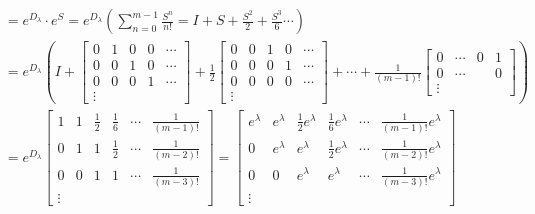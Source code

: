 \begin{align*}
     & =  e^{D_{\lambda}} \cdot e^{S} = e^{D_{\lambda}} \left( \sum_{n=0}^{m - 1} \frac{S^n}{n!} = I + S + \frac{S^2}{2} + \frac{S^3}{6} \cdots \right) \\
     & =  e^{D_{\lambda}} \left(I + \begin{bmatrix} 0 & 1 & 0  &  0 & \cdots \\ 0 & 0 & 1 & 0 & \cdots \\ 0 & 0 & 0 & 1 & \cdots \\ \vdots & & & \end{bmatrix} +
    \frac{1}{2} \begin{bmatrix} 0 & 0 & 1  &  0 & \cdots \\ 0 & 0 & 0 & 1 & \cdots \\ 0 & 0 & 0 & 0 & \cdots \\ \vdots & & & \end{bmatrix} + \cdots +
    \frac{1}{(m-1)!} \begin{bmatrix} 0 &  \cdots & 0 & 1  \\ 0 & \cdots & & 0 \\  \vdots & & & \end{bmatrix}  \right)                                                                                               \\
     & = e^{D_{\lambda}} \begin{bmatrix}
        1      & 1 & \frac{1}{2} & \frac{1}{6} & \cdots & \frac{1}{(m -1)!} \\
        0      & 1 & 1           & \frac{1}{2} & \cdots & \frac{1}{(m -2)!} \\
        0      & 0 & 1           & 1           & \cdots & \frac{1}{(m -3)!} \\
        \vdots &   &             &
    \end{bmatrix} = \begin{bmatrix}
        e^{\lambda} & e^{\lambda} & \frac{1}{2} e^{\lambda} & \frac{1}{6}  e^{\lambda} & \cdots & \frac{1}{(m-1)!}    e^{\lambda} \\
        0           & e^{\lambda} & e^{\lambda}             & \frac{1}{2}  e^{\lambda} & \cdots & \frac{1}{(m-2)!}   e^{\lambda}  \\
        0           & 0           & e^{\lambda}             & e^{\lambda}              & \cdots & \frac{1}{(m-3)!}   e^{\lambda}  \\
        \vdots      &             &                         &
    \end{bmatrix}
\end{align*}
